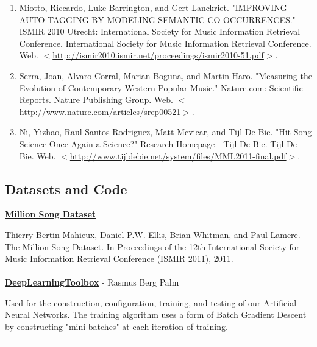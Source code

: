 \documentclass[12pt]{article}
\newcommand{\horizontalLine}{
	\begin{center}
		\hrule width 1.0\textwidth
	\end{center}
}
\begin{document}
\begin{enumerate}
    \item Miotto, Riccardo, Luke Barrington, and Gert Lanckriet. "IMPROVING AUTO-TAGGING BY MODELING SEMANTIC CO-OCCURRENCES." ISMIR 2010 Utrecht: International Society for Music Information Retrieval Conference. International Society for Music Information Retrieval Conference. Web. $<$\href{http://ismir2010.ismir.net/proceedings/ismir2010-51.pdf}{http://ismir2010.ismir.net/proceedings/ismir2010-51.pdf}$>$.\vspace{-1ex}
    
    \item Serra, Joan, Alvaro Corral, Marian Boguna, and Martin Haro. "Measuring the Evolution of Contemporary Western Popular Music." Nature.com: Scientific Reports. Nature Publishing Group. Web. $<$\href{http://www.nature.com/articles/srep00521}{http://www.nature.com/articles/srep00521}$>$.\vspace{-1ex}
    
    \item Ni, Yizhao, Raul Santos-Rodriguez, Matt Mcvicar, and Tijl De Bie. "Hit Song Science Once Again a Science?" Research Homepage - Tijl De Bie. Tijl De Bie. Web. $<$\href{http://www.tijldebie.net/system/files/MML2011-final.pdf}{http://www.tijldebie.net/system/files/MML2011-final.pdf}$>$.

\end{enumerate}
\subsection{Datasets and Code}
\label{subsec:datasetsAndCode}
\href{http://labrosa.ee.columbia.edu/millionsong/}{\textbf{Million Song Dataset}}

Thierry Bertin-Mahieux, Daniel P.W. Ellis, Brian Whitman, and Paul Lamere. 
The Million Song Dataset. In Proceedings of the 12th International Society
for Music Information Retrieval Conference (ISMIR 2011), 2011.
\\
\\
\href{https://github.com/rasmusbergpalm/DeepLearnToolbox}{\textbf{DeepLearningToolbox}} - Rasmus Berg Palm

Used for the construction, configuration, training, and testing of our Artificial Neural Networks. The training algorithm uses a form of Batch Gradient Descent by constructing "mini-batches" at each iteration of training.

\appendix

\horizontalLine
\end{document}
